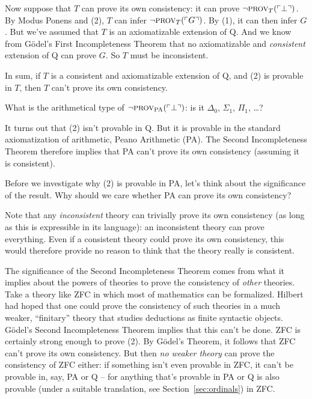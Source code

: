 Now suppose that $T$ can prove its own consistency:
it can prove $\neg \smallcaps{Prov}_T(\gn{\bot})$.
By Modus Ponens and (2),
$T$ can infer $\neg \smallcaps{Prov}_{T}(\gn{G})$.
By (1),
it can then infer $G$.
But we've assumed that $T$ is an axiomatizable extension of Q.
And we know from Gödel's First Incompleteness Theorem that
no axiomatizable and \emph{consistent} extension of Q can prove $G$.
So $T$ must be inconsistent.

In sum,
if $T$ is a consistent and axiomatizable extension of Q,
and (2) is provable in $T$,
then $T$ can't prove its own consistency.

\begin{exercise}
  What is the arithmetical type of $\neg \smallcaps{Prov}_{\mathrm{PA}}(\gn{\bot})$:
  is it $\Delta_0$, $\Sigma_1$, $\Pi_1$, \ldots?
\end{exercise}

It turns out that (2) isn't provable in Q.
But it is provable in the standard axiomatization of arithmetic,
Peano Arithmetic (PA).
The Second Incompleteness Theorem therefore implies that
PA can't prove its own consistency
(assuming it is consistent).

Before we investigate why (2) is provable in PA,
let's think about the significance of the result.
Why should we care whether PA can prove its own consistency?

Note that any \emph{inconsistent} theory can trivially prove its own consistency
(as long as this is expressible in its language):
an inconsistent theory can prove everything.
Even if a consistent theory could prove its own consistency,
this would therefore provide no reason to think
that the theory really is consistent.

The significance of the Second Incompleteness Theorem comes from what it implies
about the powers of theories to prove the consistency of \emph{other} theories.
Take a theory like ZFC in which most of mathematics can be formalized.
Hilbert had hoped that one could prove the consistency of such theories
in a much weaker, ``finitary'' theory that studies deductions as finite syntactic objects.
Gödel's Second Incompleteness Theorem implies that this can't be done.
ZFC is certainly strong enough to prove (2).
By Gödel's Theorem,
it follows that ZFC can't prove its own consistency.
But then \emph{no weaker theory} can prove the consistency of ZFC either:
if something isn't even provable in ZFC,
it can't be provable in, say, PA or Q --
for anything that's provable in PA or Q is also provable
(under a suitable translation, see Section~\ref{sec:ordinals})
in ZFC.

